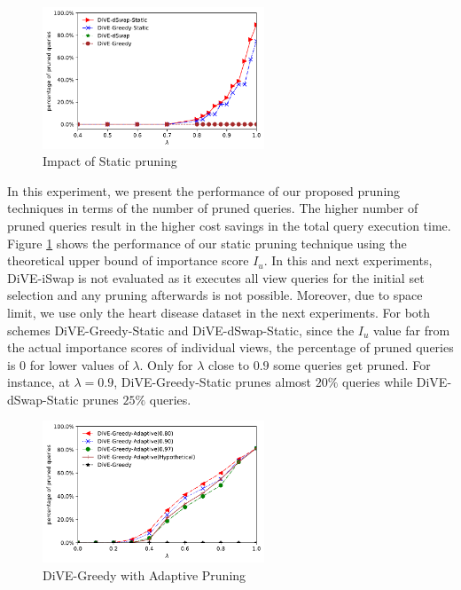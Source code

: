 %

\begin{figure}[t]
	\includegraphics[width=2.6in]{figures/results/no_pruning_vs_static_extend_color}
			\vspace{-8pt}
	\caption{Impact of Static pruning}%
	\label{fig:static-pruning}
\end{figure}


{}
In this experiment, we present the performance of our proposed pruning techniques in terms of the number of pruned queries. The higher number of pruned queries result in the higher cost savings in the total query execution time. Figure \ref{fig:static-pruning} shows the performance of our static pruning technique using the theoretical upper bound of importance score $I_u$. In this and next experiments, DiVE-iSwap is not evaluated as it executes all view queries for the initial set selection and any pruning afterwards is not possible. Moreover, due to space limit, we use only the heart disease dataset in the next experiments.
%
For both schemes DiVE-Greedy-Static and DiVE-dSwap-Static, since the $I_u$ value far from the actual importance scores of individual views, the percentage of pruned queries is $0$ for lower values of $\lambda$. Only for $\lambda$ close to $0.9$ some queries get pruned. For instance, at $\lambda=0.9$, DiVE-Greedy-Static prunes almost $20\%$ queries while DiVE-dSwap-Static prunes $25\%$ queries. 


\begin{figure}[t]
	\includegraphics[width=2.6in]{figures/results/pruning_performance_greedy_adaptive_extended_1_color}
			\vspace{-15pt}
	\caption{DiVE-Greedy with Adaptive Pruning}%
	\label{fig:pruning_performance_greedy}
\end{figure}

